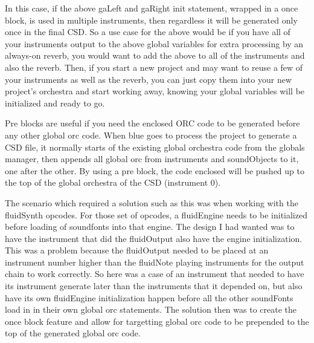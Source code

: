 In this case, if the above gaLeft and gaRight init statement, wrapped in
a once block, is used in multiple instruments, then regardless it will
be generated only once in the final CSD. So a use case for the above
would be if you have all of your instruments output to the above global
variables for extra processing by an always-on reverb, you would want to
add the above to all of the instruments and also the reverb. Then, if
you start a new project and may want to reuse a few of your instruments
as well as the reverb, you can just copy them into your new project's
orchestra and start working away, knowing your global variables will be
initialized and ready to go.

Pre blocks are useful if you need the enclosed ORC code to be generated
before any other global orc code. When blue goes to process the project
to generate a CSD file, it normally starts of the existing global
orchestra code from the globals manager, then appends all global orc
from instruments and soundObjects to it, one after the other. By using a
pre block, the code enclosed will be pushed up to the top of the global
orchestra of the CSD (instrument 0).

The scenario which required a solution such as this was when working
with the fluidSynth opcodes. For those set of opcodes, a fluidEngine
needs to be initialized before loading of soundfonts into that engine.
The design I had wanted was to have the instrument that did the
fluidOutput also have the engine initialization. This was a problem
because the fluidOutput needed to be placed at an instrument number
higher than the fluidNote playing instruments for the output chain to
work correctly. So here was a case of an instrument that needed to have
its instrument generate later than the instruments that it depended on,
but also have its own fluidEngine initialization happen before all the
other soundFonts load in in their own global orc statements. The
solution then was to create the once block feature and allow for
targetting global orc code to be prepended to the top of the generated
global orc code.
